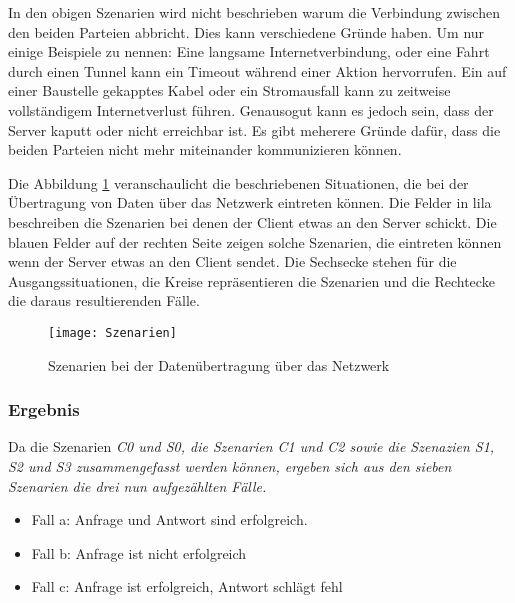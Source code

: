 %
%
In den obigen Szenarien wird nicht beschrieben warum die Verbindung zwischen den beiden Parteien abbricht. Dies kann verschiedene Gründe haben.
Um nur einige Beispiele zu nennen: Eine langsame Internetverbindung, oder eine Fahrt durch einen Tunnel kann ein Timeout während einer Aktion hervorrufen.
Ein auf einer Baustelle gekapptes Kabel oder ein Stromausfall kann zu zeitweise vollständigem Internetverlust führen.
Genausogut kann es jedoch sein, dass der Server kaputt oder nicht erreichbar ist. Es gibt meherere Gründe dafür, dass die beiden Parteien nicht mehr miteinander kommunizieren können.

Die Abbildung \ref{fig:szenarien} veranschaulicht die beschriebenen Situationen, die bei der Übertragung von Daten über das Netzwerk eintreten können.
Die Felder in lila beschreiben die Szenarien bei denen der Client etwas an den Server schickt.
Die blauen Felder auf der rechten Seite zeigen solche Szenarien, die eintreten können wenn der Server etwas an den Client sendet.
Die Sechsecke stehen für die Ausgangssituationen, die Kreise repräsentieren die Szenarien und die Rechtecke die daraus resultierenden Fälle.
\begin{figure}[H]
  \centering
  \texttt{[image: Szenarien]}
  \grayRule
  \caption{Szenarien bei der Datenübertragung über das Netzwerk}
  \label{fig:szenarien}
\end{figure}

%
%
\subsubsection*{Ergebnis}
Da die Szenarien \it{C0} und \it{S0}, die Szenarien \it{C1} und \it{C2} sowie die Szenazien \it{S1}, \it{S2} und \it{S3} zusammengefasst werden können, ergeben sich aus den sieben Szenarien die drei nun aufgezählten Fälle.
\begin{itemize}
  \item Fall a: Anfrage und Antwort sind erfolgreich.
  \item Fall b: Anfrage ist nicht erfolgreich
  \item Fall c: Anfrage ist erfolgreich, Antwort schlägt fehl
\end{itemize}